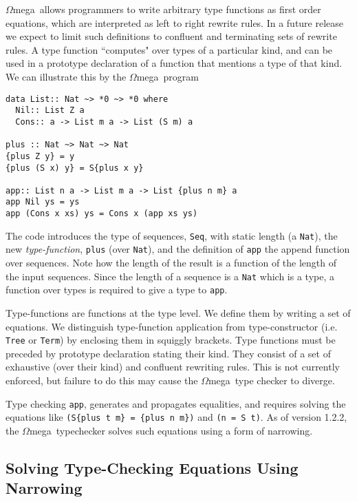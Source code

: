 \documentclass[11pt,twoside]{article}
\newcommand{\om}{$\Omega$mega}
\begin{document}
\om\ allows programmers to write arbitrary type functions 
as first order equations, which are interpreted as left to right
rewrite rules. In a future release we expect
to limit such definitions to confluent
and terminating sets of rewrite rules. A type function ``computes" over
types of a particular kind, and can be used in a prototype declaration
of a function that mentions a type of that kind. We can illustrate this
by the \om\ program
\begin{verbatim}
data List:: Nat ~> *0 ~> *0 where 
  Nil:: List Z a
  Cons:: a -> List m a -> List (S m) a
  
plus :: Nat ~> Nat ~> Nat
{plus Z y} = y
{plus (S x) y} = S{plus x y}
  
app:: List n a -> List m a -> List {plus n m} a   
app Nil ys = ys
app (Cons x xs) ys = Cons x (app xs ys)

\end{verbatim}

The code introduces the type of sequences, {\tt Seq}, with static length
(a {\tt Nat}), the new {\em type-function}, {\tt plus} (over {\tt Nat}),
and the definition of {\tt app} the append function
over sequences. Note how the length of the result is a function
of the length of the input sequences. Since the length of a sequence is
a {\tt Nat} which is a type, a function over types is required
to give a type to {\tt app}. 

Type-functions are functions at the type level. We define them by
writing a set of equations. We distinguish type-function application
from type-constructor (i.e. {\tt Tree} or {\tt Term}) by enclosing them
in squiggly brackets. Type functions must be preceded by prototype
declaration stating their kind. They consist of a set of exhaustive
(over their kind) and confluent rewriting rules.
This is not currently
enforced, but failure to do this may cause the \om\ type checker to
diverge.

Type checking {\tt app}, generates and propagates equalities, and requires
solving the equations like {\tt (S\{plus t m\} = \{plus n m\})} and {\tt (n =
S t)}. As of version 1.2.2, the \om\ typechecker solves such equations using a
form of narrowing.

\subsection{Solving Type-Checking Equations Using Narrowing}
\end{document}
